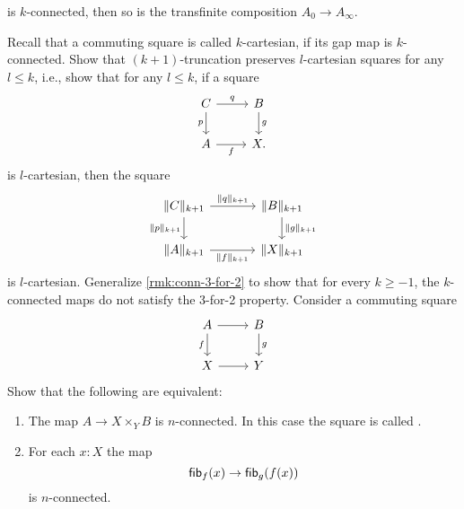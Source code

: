 \begin{exercises}
\begin{subexenum}
  is $k$-connected, then so is the transfinite composition $A_0\to A_\infty$.
\end{subexenum}
\exercise Recall that a commuting square is called $k$-cartesian, if its gap map is $k$-connected. Show that $(k+1)$-truncation preserves $l$-cartesian squares for any $l\leq k$, i.e., show that for any $l\leq k$, if a square
\begin{equation*}
  \begin{tikzcd}
    C \arrow[r,"q"] \arrow[d,swap,"p"] & B \arrow[d,"g"] \\
    A \arrow[r,swap,"f"] & X.
  \end{tikzcd}
\end{equation*}
is $l$-cartesian, then the square
\begin{equation*}
  \begin{tikzcd}[column sep=large]
    \trunc{k+1}{C} \arrow[r,"\trunc{k+1}{q}"] \arrow[d,swap,"\trunc{k+1}{p}"] & \trunc{k+1}{B} \arrow[d,"\trunc{k+1}{g}"] \\
    \trunc{k+1}{A} \arrow[r,swap,"\trunc{k+1}{f}"] & \trunc{k+1}{X}
  \end{tikzcd}
\end{equation*}
is $l$-cartesian.
\exercise Generalize \cref{rmk:conn-3-for-2} to show that for every $k\geq-1$, the $k$-connected maps do not satisfy the 3-for-2 property.
\exercise Consider a commuting square
\begin{equation*}
\begin{tikzcd}
A \arrow[d,swap,"f"] \arrow[r] & B \arrow[d,"g"] \\
X \arrow[r] & Y
\end{tikzcd}
\end{equation*}
Show that the following are equivalent:
\begin{enumerate}
\item The map $A\to X\times_Y B$ is $n$-connected. In this case the square is called .
\item For each $x:X$ the map
\begin{equation*}
\mathsf{fib}_{f}(x)\to \mathsf{fib}_{g}(f(x))
\end{equation*}
is $n$-connected.
\end{enumerate}
\end{exercises}
